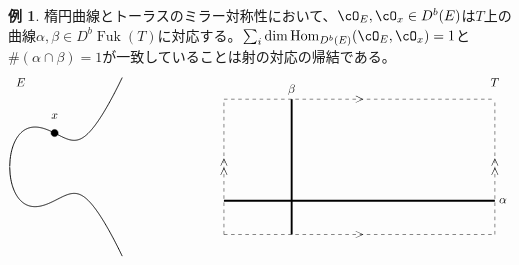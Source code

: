 \documentclass[uplatex,a4paper,dvipdfmx]{jsarticle}
\theoremstyle{plain}
\theoremstyle{definition}
\newtheorem{example}[theorem]{例}
\DeclareMathOperator{\Hom}{\mathrm{Hom}}
\DeclareMathOperator{\Fuk}{Fuk}
\begin{document}
\begin{example}
	楕円曲線とトーラスのミラー対称性において、$\cO_E, \cO_x \in D^b(E)$は$T$上の曲線$\alpha, \beta \in D^b \Fuk(T)$に対応する。$\sum_i \dim \Hom_{D^b(E)}(\cO_E, \cO_x)=1$と$\# (\alpha \cap \beta) = 1$が一致していることは射の対応の帰結である。
	\begin{displaymath}
		\begin{tikzpicture}[samples=300]
			\draw(-1, 2.5) node{$E$};
			\draw[thick,domain=-1.3247:2] plot(\x,{sqrt(\x^3-\x+1)});
			\draw[thick,domain=-1.3247:2] plot(\x,{-sqrt(\x^3-\x+1)});

			\filldraw[black] (0, 1) circle (3pt);
			\draw(0, 1.3) node[above]{$x$};

			\draw(13, 2.5) node{$T$};
			\draw[dashed] (5,-2)--(13,-2);
			\draw(9, -2) node{$>$};
			\draw[dashed] (5,2)--(13,2);
			\draw(9, 2) node{$>$};


			\draw[dashed] (5,-2)--(5,2);
			\draw(5, 0) node{\rotatebox{90}{$>>$}};
			\draw[dashed] (13,-2)--(13,2);
			\draw(13, 0) node{\rotatebox{90}{$>>$}};


			\draw[ultra thick] (5, -1)--(13, -1);
			\draw(13, -1) node[right]{$\alpha$};


			\draw[ultra thick] (7, -2)--(7, 2);
			\draw(7, 2) node[above]{$\beta$};
		\end{tikzpicture}
		\begin{tikzpicture}[scale=0.5]

		\end{tikzpicture}
	\end{displaymath}
\end{example}
\end{document}
